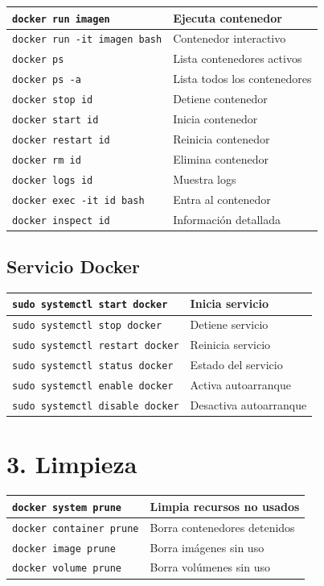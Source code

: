 \documentclass[a4paper,10pt]{article}
\begin{document}
\begin{longtable}{|p{5cm}|p{9cm}|}
\hline
\texttt{docker run imagen} & Ejecuta contenedor \\
\hline
\texttt{docker run -it imagen bash} & Contenedor interactivo \\
\hline
\texttt{docker ps} & Lista contenedores activos \\
\hline
\texttt{docker ps -a} & Lista todos los contenedores \\
\hline
\texttt{docker stop id} & Detiene contenedor \\
\hline
\texttt{docker start id} & Inicia contenedor \\
\hline
\texttt{docker restart id} & Reinicia contenedor \\
\hline
\texttt{docker rm id} & Elimina contenedor \\
\hline
\texttt{docker logs id} & Muestra logs \\
\hline
\texttt{docker exec -it id bash} & Entra al contenedor \\
\hline
\texttt{docker inspect id} & Información detallada \\
\hline
\end{longtable}

\subsection*{Servicio Docker}

\begin{longtable}{|p{6cm}|p{8cm}|}
\hline
\texttt{sudo systemctl start docker} & Inicia servicio \\
\hline
\texttt{sudo systemctl stop docker} & Detiene servicio \\
\hline
\texttt{sudo systemctl restart docker} & Reinicia servicio \\
\hline
\texttt{sudo systemctl status docker} & Estado del servicio \\
\hline
\texttt{sudo systemctl enable docker} & Activa autoarranque \\
\hline
\texttt{sudo systemctl disable docker} & Desactiva autoarranque \\
\hline
\end{longtable}

\section*{3. Limpieza}

\begin{longtable}{|p{5cm}|p{9cm}|}
\hline
\texttt{docker system prune} & Limpia recursos no usados \\
\hline
\texttt{docker container prune} & Borra contenedores detenidos \\
\hline
\texttt{docker image prune} & Borra imágenes sin uso \\
\hline
\texttt{docker volume prune} & Borra volúmenes sin uso \\
\hline
\end{longtable}
\end{document}
